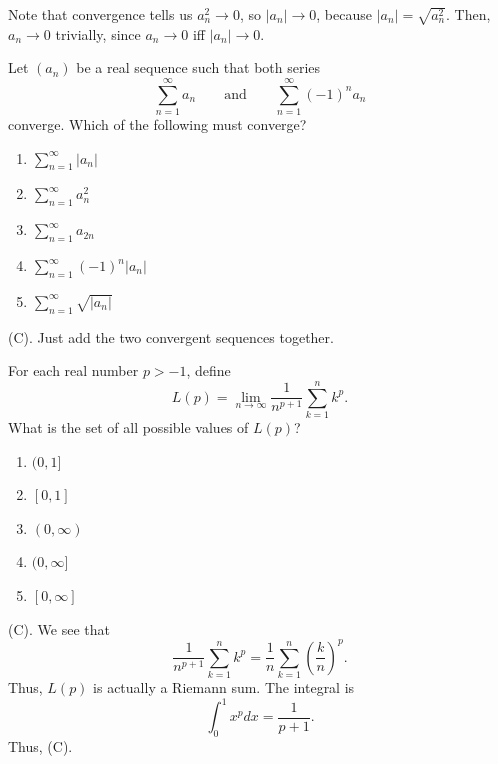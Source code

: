 \begin{remark}
Note that convergence tells us $a_n^2 \rightarrow 0$, so $|a_n| \rightarrow 0$, 
because $|a_n| = \sqrt{a_n^2}$. Then, $a_n \rightarrow 0$ trivially, since 
$a_n \rightarrow 0$ iff $|a_n| \rightarrow 0$.
\end{remark}

\begin{exercise}
Let $(a_n)$ be a real sequence such that both series
\[
\sum_{n=1}^{\infty}a_n
\qquad\text{and}\qquad
\sum_{n=1}^{\infty}(-1)^n a_n
\]
converge. Which of the following must converge?
\begin{enumerate}[label=(\Alph*)]
    \item $\displaystyle\sum_{n=1}^{\infty}|a_n|$
    \item $\displaystyle\sum_{n=1}^{\infty}a_n^2$
    \item $\displaystyle\sum_{n=1}^{\infty}a_{2n}$
    \item $\displaystyle\sum_{n=1}^{\infty}(-1)^n|a_n|$
    \item $\displaystyle\sum_{n=1}^{\infty}\sqrt{|a_n|}$
\end{enumerate}
\end{exercise}
\begin{solution}
(C). Just add the two convergent sequences together.
\end{solution}

\begin{exercise}
For each real number $p>-1$, define
\[
L(p)=\lim_{n\to\infty}
\frac{1}{n^{p+1}}\sum_{k=1}^n k^p.
\]
What is the set of all possible values of $L(p)$?

\begin{enumerate}[label=(\Alph*)]
    \item $(0,1]$
    \item $[0,1]$
    \item $(0,\infty)$
    \item $(0,\infty]$
    \item $[0,\infty]$
\end{enumerate}
\end{exercise}
\begin{solution}
(C). We see that
\[
\frac{1}{n^{p + 1}}\sum_{k = 1}^n k^p  = \frac{1}{n} \sum_{k = 1}^n \left(\frac{k}{n}\right)^p.
\]
Thus, $L(p)$ is actually a Riemann sum. The integral is 
\[
\int_0^1 x^p dx = \frac{1}{p + 1}.
\]
Thus, (C).
\end{solution}

